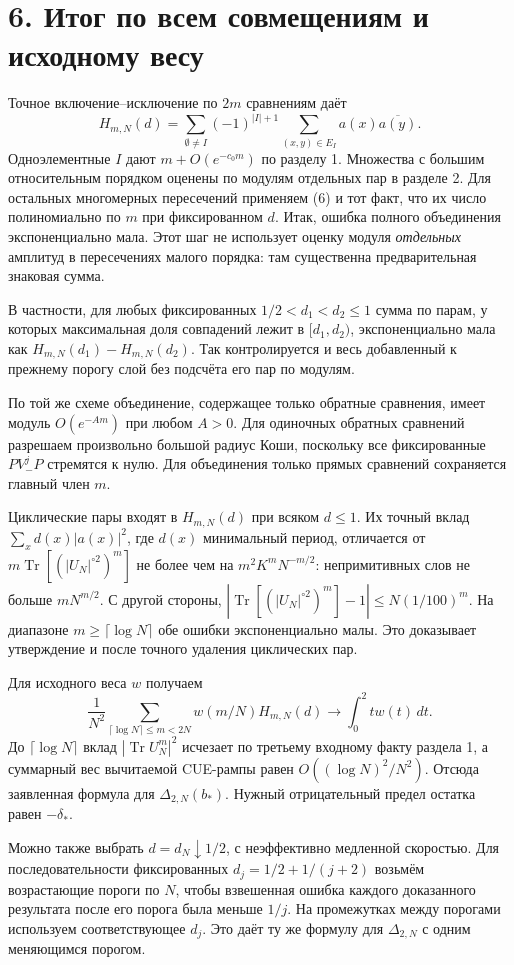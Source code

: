 \documentclass[11pt,a4paper]{article}
\newcommand{\Tr}{\operatorname{Tr}}
\newcommand{\sect}[1]{\section*{\sffamily\color{ink}#1}}
\begin{document}
\newpage
\sect{6. Итог по всем совмещениям и исходному весу}
Точное включение--исключение по \(2m\) сравнениям даёт
\[
 H_{m,N}(d)
   =\sum_{\emptyset\ne I}(-1)^{|I|+1}
                        \sum_{(x,y)\in E_I} a(x)\overline{a(y)}.
\]
Одноэлементные \(I\) дают \(m+O(e^{-c_0 m})\) по разделу 1.
Множества с большим относительным порядком оценены по модулям отдельных пар в разделе 2. Для остальных многомерных пересечений применяем (6) и тот факт, что их число полиномиально по \(m\) при фиксированном \(d\).
Итак, ошибка полного объединения экспоненциально мала. Этот шаг не использует оценку модуля \emph{отдельных} амплитуд в пересечениях малого порядка: там существенна предварительная знаковая сумма.

В частности, для любых фиксированных \(1/2<d_1<d_2\le1\) сумма по парам, у которых максимальная доля совпадений лежит в \([d_1,d_2)\), экспоненциально мала как \(H_{m,N}(d_1)-H_{m,N}(d_2)\). Так контролируется и весь добавленный к прежнему порогу слой без подсчёта его пар по модулям.

По той же схеме объединение, содержащее только обратные сравнения, имеет модуль \(O(e^{-Am})\) при любом \(A>0\). Для одиночных обратных сравнений разрешаем произвольно большой радиус Коши, поскольку все фиксированные \(P V_-^j P\) стремятся к нулю. Для объединения только прямых сравнений сохраняется главный член \(m\).

Циклические пары входят в \(H_{m,N}(d)\) при всяком \(d\le1\). Их точный вклад \(\sum_x d(x)|a(x)|^2\), где \(d(x)\) минимальный период, отличается от
\(m\Tr[(|U_N|^{\circ2})^m]\) не более чем на \(m^2 K^m N^{-m/2}\):
непримитивных слов не больше \(m N^{m/2}\).
С другой стороны,
\(\left|\Tr[(|U_N|^{\circ2})^m]-1\right|\le N(1/100)^m\).
На диапазоне \(m\ge\lceil\log N\rceil\) обе ошибки экспоненциально малы. Это доказывает утверждение и после точного удаления циклических пар.

Для исходного веса \(w\) получаем
\[
 \frac1{N^2}\sum_{\lceil\log N\rceil\le m<2N}w(m/N)H_{m,N}(d)
            \longrightarrow \int_0^2 t w(t)\,dt .
\]
До \(\lceil\log N\rceil\) вклад \(|\Tr U_N^m|^2\) исчезает по третьему входному факту раздела 1, а суммарный вес вычитаемой CUE-рампы равен
\(O((\log N)^2/N^2)\). Отсюда заявленная формула для \(\Delta_{2,N}(b_*)\).
Нужный отрицательный предел остатка равен \(-\delta_*\).

Можно также выбрать \(d=d_N\downarrow1/2\), с неэффективно медленной скоростью. Для последовательности фиксированных \(d_j=1/2+1/(j+2)\) возьмём возрастающие пороги по \(N\), чтобы взвешенная ошибка каждого доказанного результата после его порога была меньше \(1/j\). На промежутках между порогами используем соответствующее \(d_j\). Это даёт ту же формулу для \(\Delta_{2,N}\) с одним меняющимся порогом.
\end{document}
